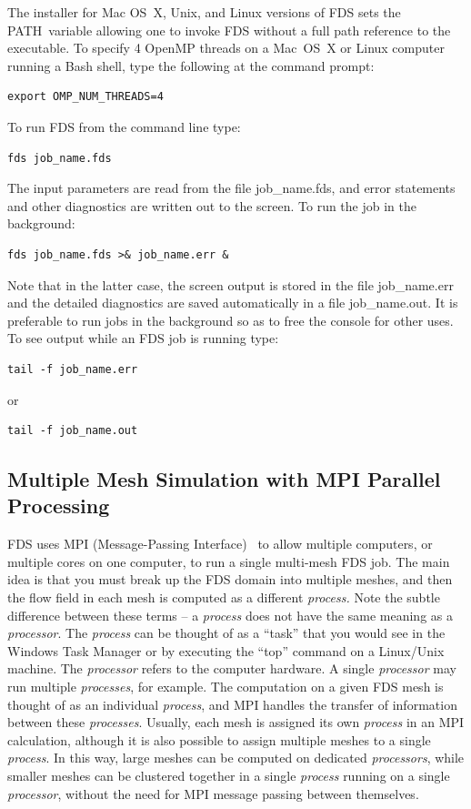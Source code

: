 \documentclass[11pt]{book}
\begin{document}
The installer for Mac OS~X, Unix, and Linux versions of FDS sets the {\ct PATH}\ variable allowing one to invoke FDS without a full path reference to the executable.  To specify 4 OpenMP threads on a Mac~OS~X or Linux computer running a Bash shell, type the following at the command prompt:
\begin{lstlisting}
export OMP_NUM_THREADS=4
\end{lstlisting}
To run FDS from the command line type:
\begin{lstlisting}
fds job_name.fds
\end{lstlisting}
The input parameters are read from the file {\ct job\_name.fds}, and error statements and other diagnostics are written out to the screen. To run the job in the background:
\begin{lstlisting}
fds job_name.fds >& job_name.err &
\end{lstlisting}
Note that in the latter case, the screen output is stored in the file {\ct job\_name.err} and the detailed diagnostics are saved automatically in a file {\ct job\_name.out}. It is preferable to run jobs in the background so as to free the console for other uses. To see output while an
FDS job is running type:
\begin{lstlisting}
tail -f job_name.err
\end{lstlisting}
or
\begin{lstlisting}
tail -f job_name.out
\end{lstlisting}


\subsection{Multiple Mesh Simulation with MPI Parallel Processing}
\label{info:parallelprocessing}

FDS uses MPI (Message-Passing Interface)~\cite{Gropp:1} to allow multiple computers, or multiple cores on one computer, to run a single multi-mesh FDS job. The main idea is that you must break up the FDS domain into multiple meshes, and then the flow field in each mesh is computed as a different {\em process.} Note the subtle difference between these terms -- a {\em process} does not have the same meaning as a {\em processor}. The {\em process} can be thought of as a ``task'' that you would see in
the Windows Task Manager or by executing the ``top'' command on a Linux/Unix machine. The {\em processor} refers to the computer hardware. A single {\em processor} may run multiple {\em processes}, for example. The computation on a given FDS mesh is thought of as an individual {\em process}, and MPI handles the transfer of information between these {\em processes}. Usually, each mesh is assigned its own {\em process} in an MPI calculation, although it is also possible to assign multiple meshes to a single {\em process}. In this way, large meshes can be computed on dedicated {\em processors}, while smaller meshes can be clustered together in a single {\em process} running on a single {\em processor}, without the need for MPI message passing between themselves.
\end{document}
